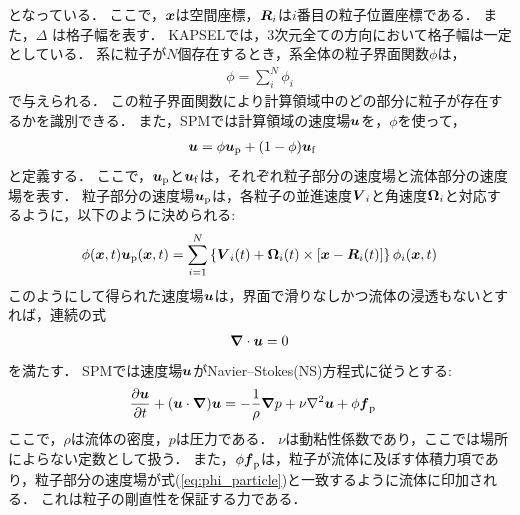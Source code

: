 \documentclass[pdflatex,a4paper,10pt,ja=standard]{bxjsarticle}
\def\vec#1{\mbox{\boldmath $#1$}}
\begin{document}
となっている．
ここで，$\vec{x}$は空間座標，$\vec{R}_{i}$は$i$番目の粒子位置座標である．
また，$\Delta$ は格子幅を表す．
KAPSELでは，3次元全ての方向において格子幅は一定としている．
系に粒子が$N$個存在するとき，系全体の粒子界面関数$\phi$は，
\begin{align}
    \phi = \sum_{i}^{N} \phi_{i}
\end{align}
で与えられる．
この粒子界面関数により計算領域中のどの部分に粒子が存在するかを識別できる．
また，SPMでは計算領域の速度場$\vec{u}$を，$\phi$を使って，
\begin{align}
    \vec{u} &= \phi \vec{u}_{\mathrm p} + (1-\phi) \vec{u}_{\mathrm f} 
\end{align}
と定義する．
ここで，$\vec{u}_{\mathrm p}$と$\vec{u}_{\mathrm f}$は，それぞれ粒子部分の速度場と流体部分の速度場を表す．
粒子部分の速度場$\vec{u}_{\mathrm p}$は，各粒子の並進速度$\vec{V}_{i}$と角速度$\vec{\Omega}_{i}$と対応するように，以下のように決められる:
\begin{align}
    \phi(\vec{x},t) \vec{u}_{\mathrm p}(\vec{x},t) = \sum_{i=1}^{N}\left\{\vec{V}_{i}(t) + \vec{\Omega}_{i}(t) \times [\vec{x} - \vec{R}_{i}(t)] \right\} \phi_{i}(\vec{x},t) 
    \label{eq:phi_particle}
\end{align}
このようにして得られた速度場$\vec{u}$は，界面で滑りなしかつ流体の浸透もないとすれば，連続の式
\begin{align}
    \vec{\nabla} \cdot \vec{u} = 0
\end{align}
を満たす．
SPMでは速度場$\vec{u}$がNavier--Stokes(NS)方程式に従うとする:
\begin{align}
    \frac{\partial \vec{u}}{\partial t} + (\vec{u} \cdot \vec{\nabla}) \vec{u} & = - \frac{1}{\rho} \vec{\nabla} p + \nu \nabla ^2 \vec{u} + \phi \vec{f}_{\mathrm p}
    \label{eq:navier_stokes}
\end{align}
ここで，$\rho$は流体の密度，$p$は圧力である．
$\nu$は動粘性係数であり，ここでは場所によらない定数として扱う．
また，$\phi \vec{f}_{\mathrm p}$は，粒子が流体に及ぼす体積力項であり，粒子部分の速度場が式(\ref{eq:phi_particle})と一致するように流体に印加される．
これは粒子の剛直性を保証する力である．
\end{document}
